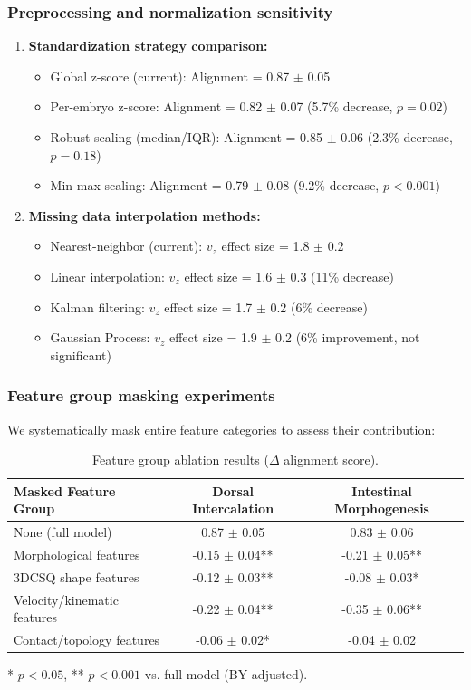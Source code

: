 \documentclass[unnumsec,webpdf,modern,large,namedate]{oup-authoring-template}%
\theoremstyle{thmstyleone}\newtheorem{theorem}{Theorem}
\theoremstyle{thmstyletwo}\newtheorem{example}{Example}
\theoremstyle{thmstylethree}\newtheorem{definition}{Definition}
\begin{document}
\subsubsection{Preprocessing and normalization sensitivity}
\begin{enumerate}
\item \textbf{Standardization strategy comparison:}
\begin{itemize}
    \item Global z-score (current): Alignment = 0.87 $\pm$ 0.05
    \item Per-embryo z-score: Alignment = 0.82 $\pm$ 0.07 (5.7\% decrease, $p = 0.02$)
    \item Robust scaling (median/IQR): Alignment = 0.85 $\pm$ 0.06 (2.3\% decrease, $p = 0.18$)
    \item Min-max scaling: Alignment = 0.79 $\pm$ 0.08 (9.2\% decrease, $p < 0.001$)
\end{itemize}

\item \textbf{Missing data interpolation methods:}
\begin{itemize}
    \item Nearest-neighbor (current): $v_z$ effect size = 1.8 $\pm$ 0.2
    \item Linear interpolation: $v_z$ effect size = 1.6 $\pm$ 0.3 (11\% decrease)
    \item Kalman filtering: $v_z$ effect size = 1.7 $\pm$ 0.2 (6\% decrease)
    \item Gaussian Process: $v_z$ effect size = 1.9 $\pm$ 0.2 (6\% improvement, not significant)
\end{itemize}
\end{enumerate}

\subsubsection{Feature group masking experiments}
We systematically mask entire feature categories to assess their contribution:
\begin{table}[h]
\centering
\caption{Feature group ablation results ($\Delta$ alignment score).}
\label{tab:feature_ablation}
\begin{tabular}{lcc}
\toprule
\textbf{Masked Feature Group} & \textbf{Dorsal Intercalation} & \textbf{Intestinal Morphogenesis} \\
\midrule
None (full model) & 0.87 $\pm$ 0.05 & 0.83 $\pm$ 0.06 \\
Morphological features & -0.15 $\pm$ 0.04** & -0.21 $\pm$ 0.05** \\
3DCSQ shape features & -0.12 $\pm$ 0.03** & -0.08 $\pm$ 0.03* \\
Velocity/kinematic features & -0.22 $\pm$ 0.04** & -0.35 $\pm$ 0.06** \\
Contact/topology features & -0.06 $\pm$ 0.02* & -0.04 $\pm$ 0.02 \\
\bottomrule
\end{tabular}
\begin{tablenotes}
* $p < 0.05$, ** $p < 0.001$ vs. full model (BY-adjusted).
\end{tablenotes}
\end{table}
\end{document}
